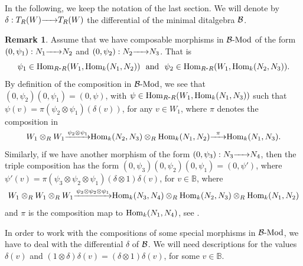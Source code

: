 \documentclass{article}
\theoremstyle{definition}
\newtheorem{remark}[theorem]{Remark}
\newcommand{\Hom}{{ \rm Hom }}
\newcommand{\Mod}{{ \rm Mod }}
\newcommand{\g}{\hbox{-}}
\newcommand{\hueca}[1]{\mathbb{#1}}
\newcommand{\rightmap}[1]{\smash{\mathop{\hbox to 
20pt{\rightarrowfill}}\limits^{#1}}}
\begin{document}
In the following, we keep the notation of the last section. We will denote by $\delta:T_R(W)\rightmap{}T_R(W)$ the differential 
of the minimal ditalgebra ${\cal B}$. 


\begin{remark}\label{R: compos de segundas comp en B-Mod} Assume that we have composable morphisms in ${\cal B}\g\Mod$ of the form 
$(0,\psi_1):N_1\rightmap{}N_2$ and $(0,\psi_2):N_2\rightmap{}N_3$.
That is 
$$\psi_1\in \Hom_{R\g R}(W_1,\Hom_k(N_1,N_2)) \hbox{ \ and \ } \psi_2\in \Hom_{R\g R}(W_1,\Hom_k(N_2,N_3)).$$
By definition of the composition in ${\cal B}\g\Mod$, we see that $(0,\psi_2)(0,\psi_1)=(0,\psi)$, with $\psi\in \Hom_{R\g R}(W_1,\Hom_k(N_1,N_3))$  such that 
$\psi(v)=\pi (\psi_2\otimes \psi_1)(\delta(v))$, for any $v\in W_1$, where $\pi$ denotes the composition in  
$$W_1\otimes_RW_1\rightmap{ \ \psi_2\otimes\psi_1 \ }\Hom_k(N_2,N_3)\otimes_R\Hom_k(N_1,N_2)\rightmap{\pi}\Hom_k(N_1,N_3).$$
Similarly, if we have another morphism of the form $(0,\psi_3): N_3\rightmap{}N_4$, then the triple  composition has the form 
$(0,\psi_3)(0,\psi_2)(0,\psi_1)=(0,\psi')$, where 
$\psi'(v)=\pi(\psi_3\otimes\psi_2\otimes\psi_1)(\delta\otimes 1)\delta(v)$, for $v\in \hueca{B}$, where 
$$W_1\otimes_RW_1\otimes_RW_1\rightmap{ \  \psi_3\otimes  \psi_2\otimes\psi_1 \ }\Hom_k(N_3,N_4)\otimes_R\Hom_k(N_2,N_3)\otimes_R\Hom_k(N_1,N_2)$$
and $\pi$ is the composition map to $\Hom_k(N_1,N_4)$, see \cite[(2.3)]{BSZ}. 

In order to work with the compositions of some special morphisms in ${\cal B}\g\Mod$, we have to deal with the differential $\delta$ of ${\cal B}$. We will need descriptions for the values $\delta(v)$ and $(1\otimes \delta)\delta(v)=(\delta\otimes 1)\delta(v)$, for some $v\in \hueca{B}$. 
\end{remark}
 
\end{document}
